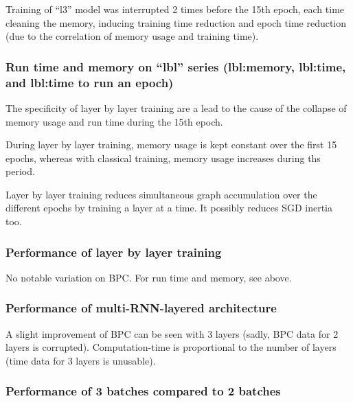 Training of ``l3'' model was interrupted 2 times before the 15th epoch,
each time cleaning the memory, inducing training time reduction and
epoch time reduction (due to the correlation of memory usage and
training time).

\subsubsection{\texorpdfstring{Run time and memory on ``lbl'' series
(lbl:memory, lbl:time, and lbl:time to run an
epoch)}{Run time and memory on lbl series (lbl:memory, lbl:time, and lbl:time to run an epoch)}}\label{run-time-and-memory-on-lbl-series-lblmemory-lbltime-and-lbltime-to-run-an-epoch}

The specificity of layer by layer training are a lead to the cause of
the collapse of memory usage and run time during the 15th epoch.

During layer by layer training, memory usage is kept constant over the
first 15 epochs, whereas with classical training, memory usage increases
during ths period.

Layer by layer training reduces simultaneous graph accumulation over the
different epochs by training a layer at a time. It possibly reduces SGD
inertia too.

\subsubsection{Performance of layer by layer
training}\label{performance-of-layer-by-layer-training}

No notable variation on BPC. For run time and memory, see above.

\subsubsection{Performance of multi-RNN-layered
architecture}\label{performance-of-multi-rnn-layered-architecture}

A slight improvement of BPC can be seen with 3 layers (sadly, BPC data
for 2 layers is corrupted). Computation-time is proportional to the
number of layers (time data for 3 layers is unusable).

\subsubsection{Performance of 3 batches compared to 2
batches}\label{performance-of-3-batches-compared-to-2-batches}

